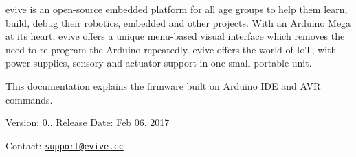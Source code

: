 evive is an open-\/source embedded platform for all age groups to help them learn, build, debug their robotics, embedded and other projects. With an Arduino Mega at it\textquotesingle{}s heart, evive offers a unique menu-\/based visual interface which removes the need to re-\/program the Arduino repeatedly. evive offers the world of IoT, with power supplies, sensory and actuator support in one small portable unit.

This documentation explains the firmware built on Arduino I\+DE and A\+VR commands.

Version\+: 0.. Release Date\+: Feb 06, 2017

Contact\+: \href{mailto:support@evive.cc}{\tt support@evive.\+cc} 